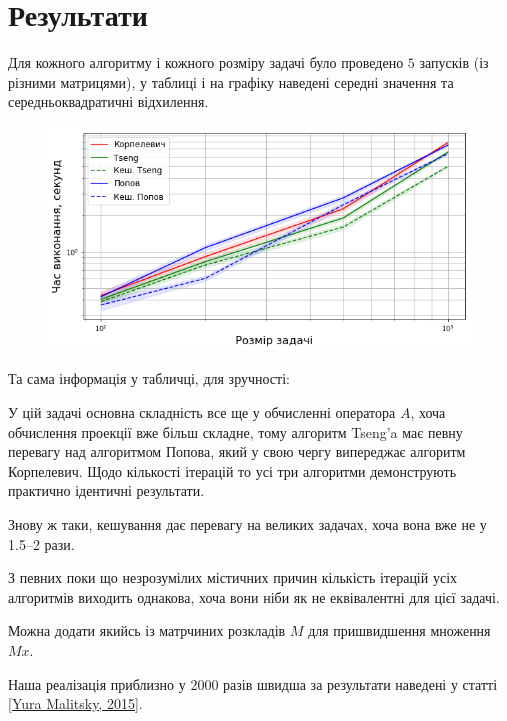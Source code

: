 \section{Результати}

Для кожного алгоритму і кожного розміру задачі було проведено $5$ запусків (із різними матрицями), у таблиці і на графіку наведені середні значення та середньоквадратичні відхилення.

\begin{figure}[H]
    \centering
    \includegraphics[width=.75\textwidth]{img/2/time.png}
\end{figure}

Та сама інформація у табличці, для зручності:



У цій задачі основна складність все ще у обчисленні оператора $A$, %
хоча обчислення проекції вже більш складне, %
тому алгоритм Tseng'a має певну перевагу над алгоритмом Попова, який у свою чергу випереджає алгоритм Корпелевич. Щодо кількості ітерацій то усі три алгоритми демонструють практично ідентичні результати.



Знову ж таки, кешування дає перевагу на великих задачах, хоча вона вже не у 1.5--2 рази.

\begin{remark}
    З певних поки що незрозумілих містичних причин кількість ітерацій усіх алгоритмів виходить однакова, хоча вони ніби як не еквівалентні для цієї задачі.
\end{remark}

\begin{remark}
    Можна додати якийсь із матрчиних розкладів $M$ для пришвидшення множення $M x$. 
\end{remark}

\begin{remark}
    Наша реалізація приблизно у 2000 разів швидша за результати наведені у статті \href{https://arxiv.org/abs/1502.04968v1}{[Yura Malitsky, 2015]}. 
\end{remark}